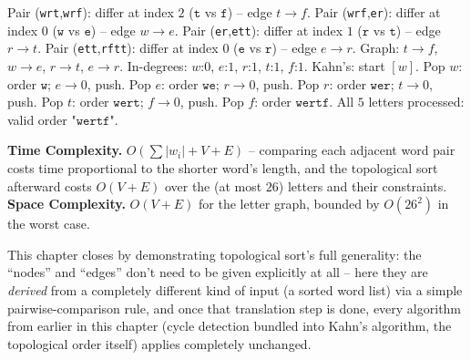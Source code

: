 Pair (\texttt{wrt},\texttt{wrf}): differ at index $2$ ($\texttt{t}$
vs $\texttt{f}$) -- edge $t \to f$. Pair (\texttt{wrf},\texttt{er}):
differ at index $0$ ($\texttt{w}$ vs $\texttt{e}$) -- edge $w \to e$.
Pair (\texttt{er},\texttt{ett}): differ at index $1$ ($\texttt{r}$ vs
$\texttt{t}$) -- edge $r \to t$. Pair (\texttt{ett},\texttt{rftt}):
differ at index $0$ ($\texttt{e}$ vs $\texttt{r}$) -- edge $e \to r$.
Graph: $t\to f$, $w\to e$, $r\to t$, $e\to r$. In-degrees: $w$:$0$,
$e$:$1$, $r$:$1$, $t$:$1$, $f$:$1$. Kahn's: start $[w]$. Pop $w$:
order $\texttt{w}$; $e\to0$, push. Pop $e$: order $\texttt{we}$;
$r\to0$, push. Pop $r$: order $\texttt{wer}$; $t\to0$, push. Pop $t$:
order $\texttt{wert}$; $f\to0$, push. Pop $f$: order
$\texttt{wertf}$. All $5$ letters processed: valid order
$\texttt{"wertf"}$.

\begin{complexitybox}
\textbf{Time Complexity.} $O(\sum |w_i| + V + E)$ -- comparing each
adjacent word pair costs time proportional to the shorter word's
length, and the topological sort afterward costs $O(V+E)$ over the
(at most $26$) letters and their constraints.
\textbf{Space Complexity.} $O(V+E)$ for the letter graph, bounded by
$O(26^2)$ in the worst case.
\end{complexitybox}

\begin{takeawaybox}
This chapter closes by demonstrating topological sort's full
generality: the ``nodes'' and ``edges'' don't need to be given
explicitly at all -- here they are \emph{derived} from a completely
different kind of input (a sorted word list) via a simple
pairwise-comparison rule, and once that translation step is done, every
algorithm from earlier in this chapter (cycle detection bundled into
Kahn's algorithm, the topological order itself) applies completely
unchanged.
\end{takeawaybox}
